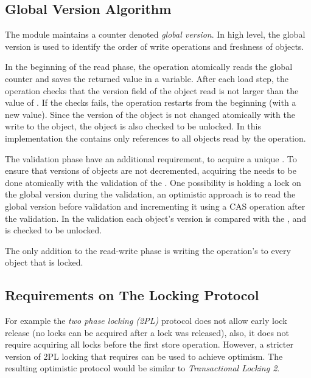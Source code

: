 \subsection{Global Version Algorithm}
The module maintains a counter denoted \emph{global version}.
In high level, the global version is used to identify 
the order of write operations and freshness of objects.   

In the beginning of the read phase, the operation atomically
reads the global counter and saves the returned value in 
a \readV variable. After each load step, the
operation checks that the version field of the object read
is not larger than the value of \readV. If the checks fails,
the operation restarts from the beginning 
(with a new \readV value). Since the version of the object 
is not changed atomically with the write to the object, 
the object is also checked to be unlocked. 
In this implementation the \readSet contains only 
references to all objects read by the operation.
 
The validation phase have an 
additional  requirement, to acquire a unique \writeV. 
To ensure that versions of objects are not decremented, 
acquiring the \writeV needs to be done atomically with 
the validation of the \readSet. One possibility is holding a
lock on the global version during the validation, 
an optimistic approach is to read the global version 
before validation and incrementing it using a CAS 
operation after the validation. In the \readSet validation 
each object's version is compared with the \readV, 
and is checked to be unlocked. 

The only addition to the read-write phase is writing the 
operation's \writeV to every object that is locked. 



\subsection{Requirements on The Locking Protocol}
For example the \emph{two phase locking (2PL)} protocol 
does not allow early lock release (no locks can be acquired after a 
lock was released), also, it does not require acquiring all locks
before the first store operation. However, a stricter version 
of 2PL locking that requires \reqII can be used to achieve optimism. 
The resulting optimistic protocol would be similar to 
\emph{Transactional Locking 2}\cite{DiceSS2006}.   
